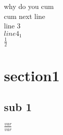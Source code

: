 \documentclass{article}
\begin{document}
    why do you cum \\
    cum next line \\ 
    line 3 \\
    $line 4_1$\\
    $\frac{1}{2}$
    \section*{section1}
    \subsection*{sub 1}
        $\frac{var}{var}$
\end{document}

